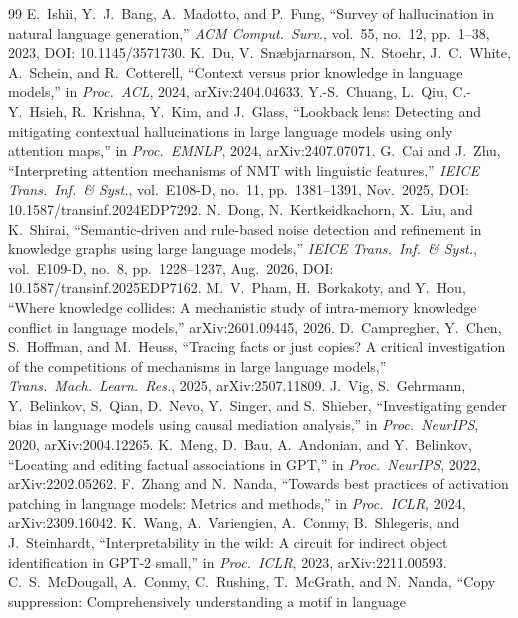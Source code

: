 \documentclass[paper]{ieice}
\begin{document}
\begin{thebibliography}{99}
E.~Ishii, Y.~J.~Bang, A.~Madotto, and P.~Fung,
``Survey of hallucination in natural language generation,''
\emph{ACM Comput.\ Surv.}, vol.~55, no.~12, pp.~1--38, 2023,
DOI: 10.1145/3571730.
 K.~Du, V.~Sn\ae bjarnarson, N.~Stoehr, J.~C.~White, A.~Schein, and R.~Cotterell,
``Context versus prior knowledge in language models,'' in \emph{Proc.\ ACL}, 2024,
arXiv:2404.04633.
 Y.-S.~Chuang, L.~Qiu, C.-Y.~Hsieh,
R.~Krishna, Y.~Kim, and J.~Glass,
``Lookback lens: Detecting and mitigating contextual hallucinations in
large language models using only attention maps,''
in \emph{Proc.\ EMNLP}, 2024, arXiv:2407.07071.
 G.~Cai and J.~Zhu,
``Interpreting attention mechanisms of NMT with linguistic features,''
\emph{IEICE Trans.\ Inf.\ \& Syst.}, vol.~E108-D, no.~11,
pp.~1381--1391, Nov.~2025,
DOI: 10.1587/transinf.2024EDP7292.
 N.~Dong, N.~Kertkeidkachorn, X.~Liu, and K.~Shirai,
``Semantic-driven and rule-based noise detection and refinement in
knowledge graphs using large language models,''
\emph{IEICE Trans.\ Inf.\ \& Syst.}, vol.~E109-D, no.~8,
pp.~1228--1237, Aug.~2026,
DOI: 10.1587/transinf.2025EDP7162.
 M.~V.~Pham, H.~Borkakoty, and Y.~Hou,
``Where knowledge collides: A mechanistic study of intra-memory knowledge
conflict in language models,'' arXiv:2601.09445, 2026.
 D.~Campregher, Y.~Chen, S.~Hoffman, and M.~Heuss,
``Tracing facts or just copies? A critical investigation of the
competitions of mechanisms in large language models,''
\emph{Trans.\ Mach.\ Learn.\ Res.}, 2025, arXiv:2507.11809.
 J.~Vig, S.~Gehrmann, Y.~Belinkov, S.~Qian, D.~Nevo, Y.~Singer, and S.~Shieber,
``Investigating gender bias in language models using causal mediation analysis,''
in \emph{Proc.\ NeurIPS}, 2020, arXiv:2004.12265.
 K.~Meng, D.~Bau, A.~Andonian, and Y.~Belinkov,
``Locating and editing factual associations in GPT,'' in \emph{Proc.\ NeurIPS}, 2022,
arXiv:2202.05262.
 F.~Zhang and N.~Nanda,
``Towards best practices of activation patching in language models: Metrics and methods,''
in \emph{Proc.\ ICLR}, 2024, arXiv:2309.16042.
 K.~Wang, A.~Variengien, A.~Conmy, B.~Shlegeris, and J.~Steinhardt,
``Interpretability in the wild: A circuit for indirect object identification in GPT-2 small,''
in \emph{Proc.\ ICLR}, 2023, arXiv:2211.00593.
 C.~S.~McDougall, A.~Conmy, C.~Rushing,
T.~McGrath, and N.~Nanda,
``Copy suppression: Comprehensively understanding a motif in language

\end{thebibliography}
\end{document}
